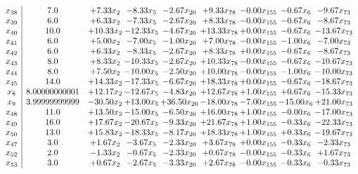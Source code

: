 \documentclass[8pt]{article}
\begin{document}
\[\begin{array}{c| c c@{\hskip 2pt} c@{\hskip 2pt} c@{\hskip 2pt} c@{\hskip 2pt} c@{\hskip 2pt} c@{\hskip 2pt} c@{\hskip 2pt} }
 x_{38}   &  7.0 & +  7.33 x_{2} & -8.33 x_{5} & -2.67 x_{20} & +  9.33 x_{78} & -0.00 x_{155} & -0.67 x_{6} & -9.67 x_{73}\\
 x_{39}   &  6.0 & +  6.33 x_{2} & -7.33 x_{5} & -2.67 x_{20} & +  8.33 x_{78} & -0.00 x_{155} & -0.67 x_{6} & -8.67 x_{73}\\
 x_{40}   &  10.0 & + 10.33 x_{2} & -12.33 x_{5} & -4.67 x_{20} & + 13.33 x_{78} & +  0.00 x_{155} & -0.67 x_{6} & -13.67 x_{73}\\
 x_{41}   &  6.0 & +  5.00 x_{2} & -7.00 x_{5} & -1.00 x_{20} & +  7.00 x_{78} & -0.00 x_{155} & -1.00 x_{6} & -7.00 x_{73}\\
 x_{42}   &  6.0 & +  6.33 x_{2} & -8.33 x_{5} & -2.67 x_{20} & +  8.33 x_{78} & +  0.00 x_{155} & -0.67 x_{6} & -8.67 x_{73}\\
 x_{43}   &  8.0 & +  8.33 x_{2} & -10.33 x_{5} & -2.67 x_{20} & + 10.33 x_{78} & -0.00 x_{155} & -0.67 x_{6} & -10.67 x_{73}\\
 x_{44}   &  8.0 & +  7.50 x_{2} & -10.00 x_{5} & -2.50 x_{20} & + 10.00 x_{78} & -0.00 x_{155} & -1.00 x_{6} & -10.00 x_{73}\\
 x_{45}   &  14.0 & + 14.33 x_{2} & -17.33 x_{5} & -6.67 x_{20} & + 18.33 x_{78} & +  0.00 x_{155} & -0.67 x_{6} & -18.67 x_{73}\\
 x_{8}   &  8.00000000001 & + 12.17 x_{2} & -12.67 x_{5} & -4.83 x_{20} & + 12.67 x_{78} & +  1.00 x_{155} & +  0.67 x_{6} & -15.33 x_{73}\\
 x_{9}   &  3.99999999999 & -30.50 x_{2} & + 13.00 x_{5} & + 36.50 x_{20} & -18.00 x_{78} & -7.00 x_{155} & -15.00 x_{6} & + 21.00 x_{73}\\
 x_{48}   &  11.0 & + 13.50 x_{2} & -15.00 x_{5} & -6.50 x_{20} & + 16.00 x_{78} & +  1.00 x_{155} & -0.00 x_{6} & -17.00 x_{73}\\
 x_{49}   &  16.0 & + 17.67 x_{2} & -20.67 x_{5} & -9.33 x_{20} & + 21.67 x_{78} & +  1.00 x_{155} & -0.33 x_{6} & -22.33 x_{73}\\
 x_{50}   &  13.0 & + 15.83 x_{2} & -18.33 x_{5} & -8.17 x_{20} & + 18.33 x_{78} & +  1.00 x_{155} & +  0.33 x_{6} & -19.67 x_{73}\\
 x_{47}   &  3.0 & +  1.67 x_{2} & -3.67 x_{5} & -2.33 x_{20} & +  3.67 x_{78} & +  0.00 x_{155} & -0.33 x_{6} & -2.33 x_{73}\\
 x_{52}   &  2.0 & -1.33 x_{2} & -0.67 x_{5} & -2.33 x_{20} & +  0.67 x_{78} & -0.00 x_{155} & -0.33 x_{6} & +  1.67 x_{73}\\
 x_{53}   &  3.0 & +  0.67 x_{2} & -2.67 x_{5} & -3.33 x_{20} & +  2.67 x_{78} & -0.00 x_{155} & -0.33 x_{6} & -0.33 x_{73}\\

\end{array}\]
\end{document}
